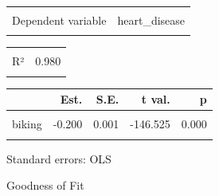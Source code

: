 \documentclass[
  ignorenonframetext,
]{beamer}
\begin{document}
\begin{frame}{}
\protect\hypertarget{section-3}{}
\begin{table}[!h]
\centering
\begin{tabular}{lr}
\toprule
\cellcolor{gray!6}{Observations} & \cellcolor{gray!6}{498}\\
Dependent variable & heart\_disease\\
\cellcolor{gray!6}{Type} & \cellcolor{gray!6}{OLS linear regression}\\
\bottomrule
\end{tabular}
\end{table} \begin{table}[!h]
\centering
\begin{tabular}{lr}
\toprule
\cellcolor{gray!6}{F(2,495)} & \cellcolor{gray!6}{11895.241}\\
R² & 0.980\\
\cellcolor{gray!6}{Adj. R²} & \cellcolor{gray!6}{0.980}\\
\bottomrule
\end{tabular}
\end{table} \begin{table}[!h]
\centering
\begin{threeparttable}
\begin{tabular}{lrrrr}
\toprule
  & Est. & S.E. & t val. & p\\
\midrule
\cellcolor{gray!6}{(Intercept)} & \cellcolor{gray!6}{14.985} & \cellcolor{gray!6}{0.080} & \cellcolor{gray!6}{186.988} & \cellcolor{gray!6}{0.000}\\
biking & -0.200 & 0.001 & -146.525 & 0.000\\
\cellcolor{gray!6}{smoking} & \cellcolor{gray!6}{0.178} & \cellcolor{gray!6}{0.004} & \cellcolor{gray!6}{50.387} & \cellcolor{gray!6}{0.000}\\
\bottomrule
\end{tabular}
\begin{tablenotes}
\item Standard errors: OLS
\end{tablenotes}
\end{threeparttable}
\end{table}
\end{frame}

\begin{frame}{}
\protect\hypertarget{section-4}{}
\begin{center}
\Huge Goodness of Fit
\end{center}
\end{frame}
\end{document}
